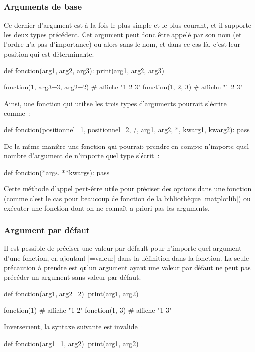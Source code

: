 		\subsubsection{Arguments de base}
		Ce dernier d'argument est à la fois le plus simple et le plus courant, et il supporte les deux types précédent. Cet argument peut donc être appelé par son nom (et l'ordre n'a pas d'importance) ou alors sans le nom, et dans ce cas-là, c'est leur position qui est déterminante.
		\begin{pythoncode}
			def fonction(arg1, arg2, arg3):
			    print(arg1, arg2, arg3)
			
			fonction(1, arg3=3, arg2=2) # affiche "1 2 3"
			fonction(1, 2, 3) # affiche "1 2 3"
		\end{pythoncode}
		
		Ainsi, une fonction qui utilise les trois types d'arguments pourrait s'écrire comme~:
		\begin{pythoncode}
			def fonction(positionnel_1, positionnel_2, /, arg1, arg2, *, kwarg1, kwarg2):
			    pass
		\end{pythoncode}
		
		De la même manière une fonction qui pourrait prendre en compte n'importe quel nombre d'argument de n'importe quel type s'écrit~:
		\begin{pythoncode}
			def fonction(*args, **kwargs):
			    pass
		\end{pythoncode}
		Cette méthode d'appel peut-être utile pour préciser des options dans une fonction (comme c'est le cas pour beaucoup de fonction de la bibliothèque \python|matplotlib|) ou exécuter une fonction dont on ne connaît a priori pas les arguments.
		
		\subsubsection{Argument par défaut}
		Il est possible de préciser une valeur par défault pour n'importe quel argument d'une fonction, en ajoutant \python|=valeur| dans la définition dans la fonction. La seule précaution à prendre est qu'un argument ayant une valeur par défaut ne peut pas précéder un argument sans valeur par défaut.
		\begin{pythoncode}
			def fonction(arg1, arg2=2):
			    print(arg1, arg2)
			
			fonction(1) # affiche "1 2"
			fonction(1, 3) # affiche "1 3"
		\end{pythoncode}
		
		Inversement, la syntaxe suivante est invalide~:
		\begin{pythoncode}
			def fonction(arg1=1, arg2):
			    print(arg1, arg2)
		\end{pythoncode}
		
